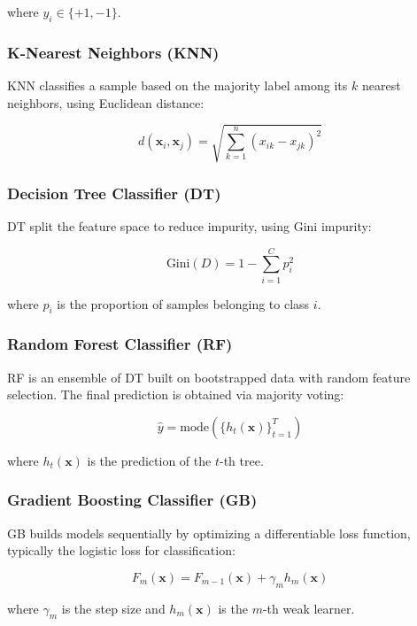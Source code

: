 \documentclass[conference]{IEEEtran}
\begin{document}
where $y_i \in \{+1, -1\}$.

\subsubsection{\textbf{K-Nearest Neighbors (KNN)}}
KNN classifies a sample based on the majority label among its $k$ nearest neighbors, using Euclidean distance:

\begin{equation}
d(\mathbf{x}_i, \mathbf{x}_j) = \sqrt{\sum_{k=1}^{n} (x_{ik} - x_{jk})^2}
\end{equation}

\subsubsection{\textbf{Decision Tree Classifier (DT)}}
DT split the feature space to reduce impurity, using Gini impurity:

\begin{equation}
\text{Gini}(D) = 1 - \sum_{i=1}^{C} p_i^2
\end{equation}

where $p_i$ is the proportion of samples belonging to class $i$.

\subsubsection{\textbf{Random Forest Classifier (RF)}}
RF is an ensemble of DT built on bootstrapped data with random feature selection. The final prediction is obtained via majority voting:

\begin{equation}
\hat{y} = \text{mode}\left(\{h_t(\mathbf{x})\}_{t=1}^{T}\right)
\end{equation}

where $h_t(\mathbf{x})$ is the prediction of the $t$-th tree.

\subsubsection{\textbf{Gradient Boosting Classifier (GB)}}
GB builds models sequentially by optimizing a differentiable loss function, typically the logistic loss for classification:

\begin{equation}
F_m(\mathbf{x}) = F_{m-1}(\mathbf{x}) + \gamma_m h_m(\mathbf{x})
\end{equation}

where $\gamma_m$ is the step size and $h_m(\mathbf{x})$ is the $m$-th weak learner.
\end{document}
